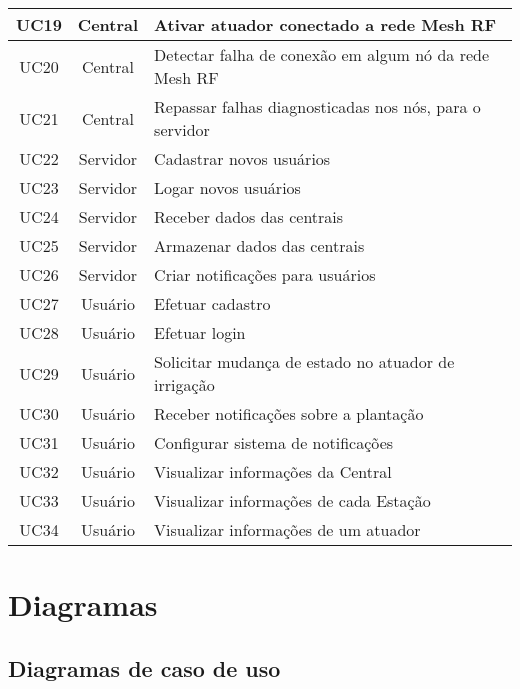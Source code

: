 \begin{table}[H]
\begin{tabular}{|c|c|l|}
					UC19 & Central  & Ativar atuador conectado a rede Mesh RF                 \\ \hline
					UC20 & Central  & Detectar falha de conexão em algum nó da rede Mesh RF   \\ \hline
					UC21 & Central  & Repassar falhas diagnosticadas nos nós, para o servidor \\ \hline
					UC22 & Servidor & Cadastrar novos usuários                                \\ \hline
					UC23 & Servidor & Logar novos usuários                                    \\ \hline
					UC24 & Servidor & Receber dados das centrais                              \\ \hline
					UC25 & Servidor & Armazenar dados das centrais                            \\ \hline
					UC26 & Servidor & Criar notificações para usuários                        \\ \hline
					UC27 & Usuário  & Efetuar cadastro                                        \\ \hline
					UC28 & Usuário  & Efetuar login                                           \\ \hline
					UC29 & Usuário  & Solicitar mudança de estado no atuador de irrigação     \\ \hline
					UC30 & Usuário  & Receber notificações sobre a plantação                  \\ \hline
					UC31 & Usuário  & Configurar sistema de notificações                      \\ \hline
					UC32 & Usuário  & Visualizar informações da Central                       \\ \hline
					UC33 & Usuário  & Visualizar informações de cada Estação                  \\ \hline
					UC34 & Usuário  & Visualizar informações de um atuador                    \\ \hline
			\end{tabular}
		\end{table}


    \section{Diagramas}

    \subsection{Diagramas de caso de uso}

